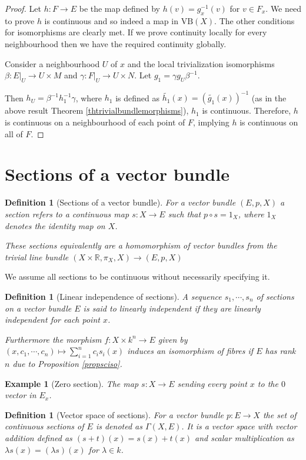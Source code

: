 \documentclass[12pt]{report}
\numberwithin{equation}{section}
\newcommand{\R}{\mathbb{R}}
\newtheorem{definition}[dummy]{Definition}
\newtheorem{example}[dummy]{Example}
\begin{document}
	\begin{proof}
		Let $h: F\to E$ be the map defined by $h(v) = g_x^{-1}(v)$ for $v \in F_x$. We need to prove $h$ is continuous and so indeed a map in $\mathrm{VB}(X)$. The other conditions for isomorphisms are clearly met. If we prove continuity locally for every neighbourhood then we have the required continuity globally.
		
		 Consider a neighbourhood $U$ of $x$ and the local trivialization isomorphisms $\beta: E|_U \to U \times M$ and $\gamma: F|_U \to U \times N$. Let $g_1 = \gamma g_U \beta^{-1}$. 
		 
		 Then $h_U = \beta^{-1} h_1^{-1} \gamma$, where $h_1$ is defined as $\widetilde{h_1}(x) = (\widetilde{g_1}(x))^{-1}$ (as in the above result Theorem \ref{thtrivialbundlemorphisms}), $h_1$ is continuous.  Therefore, $h$ is continuous on a neighbourhood of each point of $F$, implying $h$ is continuous on all of $F$.
	\end{proof}
	
	\section{Sections of a vector bundle}
	
	\begin{definition}[Sections of a vector bundle]
		For a vector bundle $(E,p,X)$ a section refers to a continuous map	$s: X \to E$ such that $p \circ s= 1_X$, where $1_X$ denotes the identity map on $X$.
		
		These sections equivalently are a homomorphism of vector bundles from the trivial line bundle $(X \times \R, \pi_X, X) \to (E,p,X)$
	\end{definition}
	We assume all sections to be continuous without necessarily specifying it.
	
	\begin{definition}[Linear independence of sections]\label{deflinindsections}
		A sequence $s_1, \cdots, s_n$ of sections on a vector bundle $E$ is said to linearly independent if they are linearly independent for each point $x$.
		
		Furthermore the morphism $f: X \times k^n \to E$ given by $(x,c_1, \cdots, c_n) \mapsto \sum_{i=1}^n c_i s_i(x)$ induces an isomorphism of fibres if $E$ has rank $n$ due to Proposition \ref{propsciso}.
		
	\end{definition}
	
	\begin{example}[Zero section]
		The map $s:X \to E $ sending every point $x$ to the $0$ vector in $E_x$.	
	\end{example}
	\begin{definition}[Vector space of sections]
		For a vector bundle $p:E \to X $ the set of continuous sections of $E$ is denoted as $\Gamma (X ,E)$. It is a vector space with vector addition defined as $(s+t)(x)=s(x)+t(x)$ and scalar multiplication as $\lambda s (x) = (\lambda s)(x)$ for $\lambda \in k$.	
	\end{definition}
	
\end{document}
